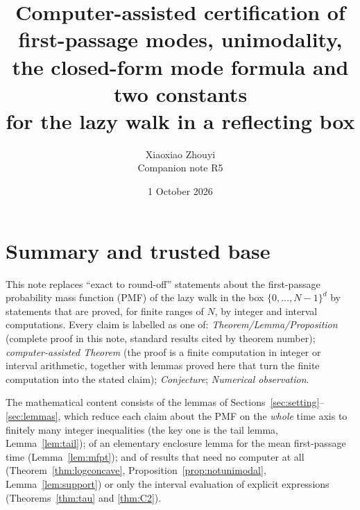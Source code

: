 \documentclass[11pt,a4paper]{article}
\title{Computer-assisted certification of first-passage modes, unimodality,\\ the closed-form mode formula and two constants\\ for the lazy walk in a reflecting box}
\author{Xiaoxiao Zhouyi\\[2pt]\normalsize Companion note R5}
\date{1 October 2026}
\theoremstyle{definition}
\theoremstyle{remark}
\begin{document}
\setlength{\emergencystretch}{3em}
\maketitle
\medskip{}\par\medskip


\section{Summary and trusted base}

This note replaces ``exact to round-off'' statements about the first-passage probability mass function (PMF) of the lazy walk in the box $\{0,\dots,N-1\}^d$ by statements that are proved, for finite ranges of $N$, by integer and interval computations. Every claim is labelled as one of: \emph{Theorem/Lemma/Proposition} (complete proof in this note, standard results cited by theorem number); \emph{computer-assisted Theorem} (the proof is a finite computation in integer or interval arithmetic, together with lemmas proved here that turn the finite computation into the stated claim); \emph{Conjecture}; \emph{Numerical observation}.

The mathematical content consists of the lemmas of Sections~\ref{sec:setting}--\ref{sec:lemmas}, which reduce each claim about the PMF on the \emph{whole} time axis to finitely many integer inequalities (the key one is the tail lemma, Lemma~\ref{lem:tail}); of an elementary enclosure lemma for the mean first-passage time (Lemma~\ref{lem:mfpt}); and of results that need no computer at all (Theorem~\ref{thm:logconcave}, Proposition~\ref{prop:notunimodal}, Lemma~\ref{lem:support}) or only the interval evaluation of explicit expressions (Theorems~\ref{thm:tau} and \ref{thm:C2}).
\end{document}

